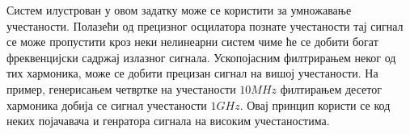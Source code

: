 Систем илустрован у овом задатку може се користити за умножавање учестаности. Полазећи од прецизног осцилатора познате учестаности 
тај сигнал се може пропустити кроз неки нелинеарни систем чиме ће се добити богат фреквенцијски садржај излазног сигнала. Ускопојасним 
филтрирањем неког од тих хармоника, може се добити прецизан сигнал на вишој учестаности. На пример, генерисањем четвртке на учестаности 
$10\unit{MHz}$ филтирањем десетог хармоника добија се сигнал учестаности $1\unit{GHz}$. Овај принцип користи се код неких појачавача 
и генратора сигнала на високим учестаностима. 